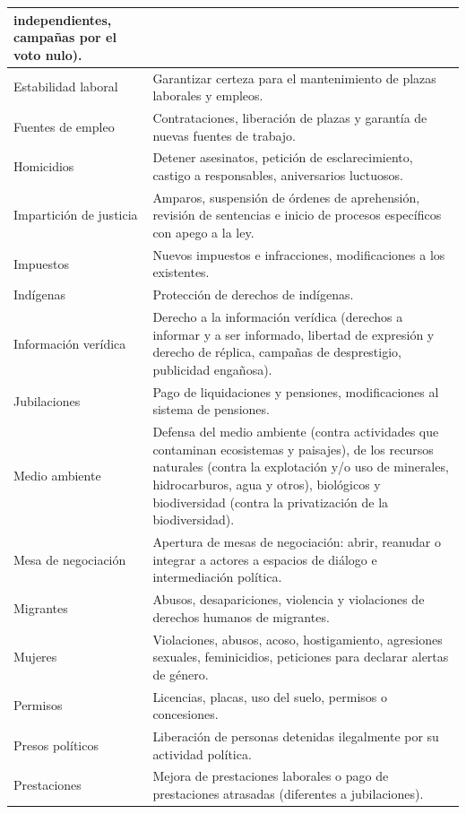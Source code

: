 \documentclass[letterpaper, 11pt]{book}
\theoremstyle{definition}
\theoremstyle{remark}
\begin{document}
{{{{{{{{{{\begin{footnotesize}
\begin{longtable}{|p{4cm}@{ }|p{11cm}@{ }|}
independientes, campañas por el voto nulo).\\
\hline
Estabilidad laboral & Garantizar certeza para el mantenimiento de plazas laborales y empleos.\\
\hline
Fuentes de empleo & Contrataciones, liberación de plazas y garantía de nuevas fuentes de trabajo.\\
\hline
Homicidios & Detener asesinatos, petición de esclarecimiento, castigo a responsables, aniversarios luctuosos.\\
\hline
Impartición de justicia & Amparos, suspensión de órdenes de aprehensión, revisión de sentencias e inicio de procesos específicos con apego a la ley.\\
\hline
Impuestos & Nuevos impuestos e infracciones, modificaciones a los existentes.\\
\hline
Indígenas & Protección de derechos de indígenas.\\
\hline
Información verídica & Derecho a la información verídica (derechos a informar y a ser informado, libertad de expresión y derecho de réplica, campañas de desprestigio, publicidad engañosa).\\
\hline
Jubilaciones & Pago de liquidaciones y pensiones, modificaciones al sistema de pensiones.\\
\hline
Medio ambiente &  Defensa del medio ambiente (contra actividades que contaminan ecosistemas y paisajes), de los recursos naturales (contra la explotación y/o uso de minerales, hidrocarburos, agua y otros), biológicos y biodiversidad (contra la privatización de la biodiversidad).\\
\hline
Mesa de negociación & Apertura de mesas de negociación: abrir, reanudar o integrar a actores a espacios de diálogo e intermediación política.\\
\hline
Migrantes &  Abusos, desapariciones, violencia y violaciones de derechos humanos de migrantes.\\
\hline
Mujeres &  Violaciones, abusos, acoso, hostigamiento, agresiones sexuales, feminicidios, peticiones para declarar alertas de género.\\
\hline
Permisos & Licencias, placas, uso del suelo, permisos o concesiones.\\
\hline
Presos políticos & Liberación de personas detenidas ilegalmente por su actividad política.\\
\hline
Prestaciones & Mejora de prestaciones laborales o pago de prestaciones atrasadas (diferentes a jubilaciones).\\
\hline

\end{longtable}
\end{footnotesize}}}}}}}}}}}
\end{document}
